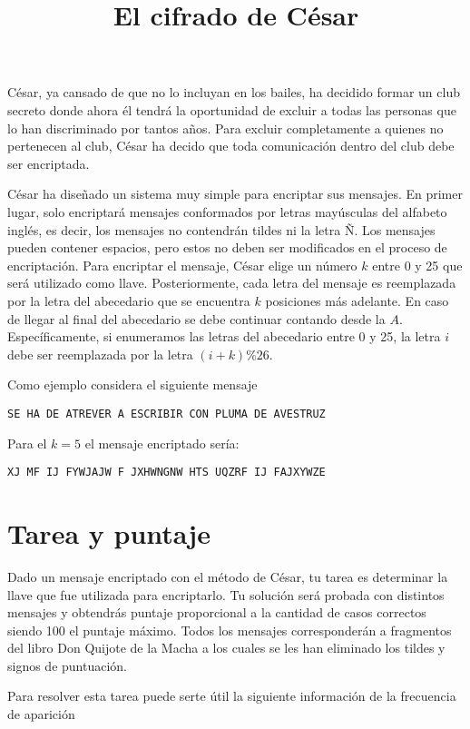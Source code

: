 \documentclass{oci}
\title{El cifrado de César}
\newcommand{\todo}[1]{{\color{red}{#1}}}
\begin{document}
\begin{problemDescription}
César, ya cansado de que no lo incluyan en los bailes, ha decidido formar un club secreto
donde ahora él tendrá la oportunidad de excluir a todas las personas que lo han discriminado por
tantos años.
Para excluir completamente a quienes no pertenecen al club, César ha decido que toda comunicación
dentro del club debe ser encriptada.

César ha diseñado un sistema muy simple para encriptar sus mensajes.
En primer lugar, solo encriptará mensajes conformados por letras mayúsculas del alfabeto
inglés, es decir, los mensajes no contendrán tildes ni la letra Ñ.
Los mensajes pueden contener espacios, pero estos no deben ser modificados en el proceso de
encriptación.
Para encriptar el mensaje, César elige un número $k$ entre 0 y 25 que será utilizado como llave.
Posteriormente, cada letra del mensaje es reemplazada por la letra del abecedario que se
encuentra $k$ posiciones más adelante.
En caso de llegar al final del abecedario se debe continuar contando desde la $A$.
Específicamente, si enumeramos las letras del abecedario entre 0 y 25, la letra $i$ debe ser
reemplazada por la letra $(i+k)\% 26$.

Como ejemplo considera el siguiente mensaje
\begin{center}
  \texttt{SE HA DE ATREVER A ESCRIBIR CON PLUMA DE AVESTRUZ}
\end{center}
Para el $k=5$ el mensaje encriptado sería:
\begin{center}
  \texttt{XJ MF IJ FYWJAJW F JXHWNGNW HTS UQZRF IJ FAJXYWZE}
\end{center}

\end{problemDescription}

\section*{Tarea y puntaje}
Dado un mensaje encriptado con el método de César, tu tarea es determinar la llave que fue
utilizada para encriptarlo.
Tu solución será probada con distintos mensajes y obtendrás puntaje proporcional a la cantidad
de casos correctos siendo 100 el puntaje máximo.
Todos los mensajes corresponderán a fragmentos del libro Don Quijote de la Macha a los cuales se
les han eliminado los tildes y signos de puntuación.

Para resolver esta tarea puede serte útil la siguiente información de la frecuencia de aparición
\todo{fill with stats}
\end{document}
